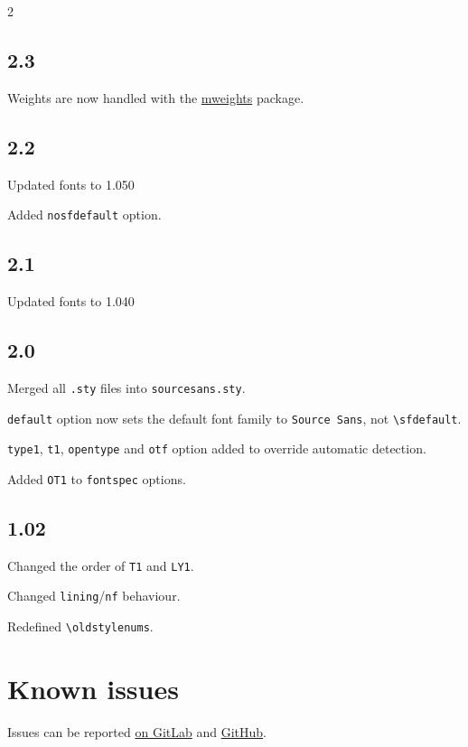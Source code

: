 \documentclass[10pt,a4paper,english]{article}
\begin{document}
\begin{multicols}{2}
\subsection*{2.3}
\begin{itemize*}
	\item Weights are now handled with the \href{http://www.ctan.org/pkg/mweights}{mweights} package.
\end{itemize*}

\subsection*{2.2}
\begin{itemize*}
	\item Updated fonts to 1.050
	\item Added \texttt{nosfdefault} option.
\end{itemize*}

\subsection*{2.1}
\begin{itemize*}
	\item Updated fonts to 1.040
\end{itemize*}

\subsection*{2.0}
\begin{itemize*}
	\item Merged all \texttt{.sty} files into \texttt{sourcesans.sty}.
	\item \texttt{default} option now sets the default font family to \texttt{Source Sans}, not \texttt{\textbackslash sfdefault}.
	\item \texttt{type1}, \texttt{t1}, \texttt{opentype} and \texttt{otf} option added to override automatic detection.
	\item Added \texttt{OT1} to \texttt{fontspec} options.
\end{itemize*}

\subsection*{1.02}
\begin{itemize*}
	\item Changed the order of \texttt{T1} and \texttt{LY1}.
	\item Changed \texttt{lining}/\texttt{nf} behaviour.
	\item Redefined \texttt{\textbackslash oldstylenums}.
\end{itemize*}

\section{Known issues}

Issues can be reported \href{https://gitlab.com/slxh/latex/sourcesans/issues}{on GitLab} and \href{https://github.com/silkeh/latex-sourcesanspro/issues}{GitHub}.

\newpage
\end{multicols}
\end{document}
